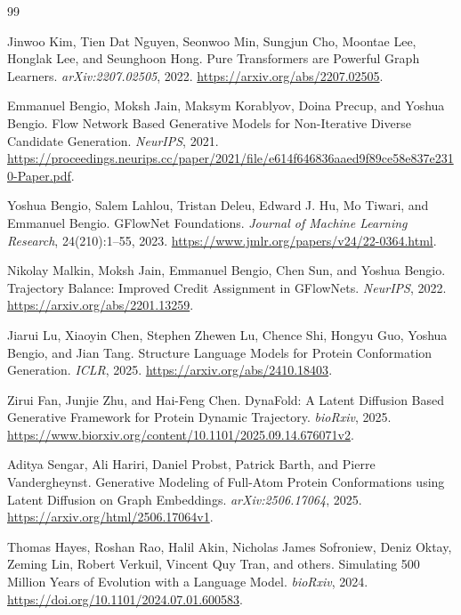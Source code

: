 \documentclass[11pt]{article}
\begin{document}
\newpage
\begin{thebibliography}{99}

Jinwoo Kim, Tien Dat Nguyen, Seonwoo Min, Sungjun Cho, Moontae Lee, Honglak Lee, and Seunghoon Hong.
\newblock Pure Transformers are Powerful Graph Learners.
\newblock \emph{arXiv:2207.02505}, 2022.
\newblock \url{https://arxiv.org/abs/2207.02505}.

Emmanuel Bengio, Moksh Jain, Maksym Korablyov, Doina Precup, and Yoshua Bengio.
\newblock Flow Network Based Generative Models for Non-Iterative Diverse Candidate Generation.
\newblock \emph{NeurIPS}, 2021.
\newblock \url{https://proceedings.neurips.cc/paper/2021/file/e614f646836aaed9f89ce58e837e2310-Paper.pdf}.

Yoshua Bengio, Salem Lahlou, Tristan Deleu, Edward J. Hu, Mo Tiwari, and Emmanuel Bengio.
\newblock GFlowNet Foundations.
\newblock \emph{Journal of Machine Learning Research}, 24(210):1--55, 2023.
\newblock \url{https://www.jmlr.org/papers/v24/22-0364.html}.

Nikolay Malkin, Moksh Jain, Emmanuel Bengio, Chen Sun, and Yoshua Bengio.
\newblock Trajectory Balance: Improved Credit Assignment in GFlowNets.
\newblock \emph{NeurIPS}, 2022.
\newblock \url{https://arxiv.org/abs/2201.13259}.

Jiarui Lu, Xiaoyin Chen, Stephen Zhewen Lu, Chence Shi, Hongyu Guo, Yoshua Bengio, and Jian Tang.
\newblock Structure Language Models for Protein Conformation Generation.
\newblock \emph{ICLR}, 2025.
\newblock \url{https://arxiv.org/abs/2410.18403}.

Zirui Fan, Junjie Zhu, and Hai-Feng Chen.
\newblock DynaFold: A Latent Diffusion Based Generative Framework for Protein Dynamic Trajectory.
\newblock \emph{bioRxiv}, 2025.
\newblock \url{https://www.biorxiv.org/content/10.1101/2025.09.14.676071v2}.

Aditya Sengar, Ali Hariri, Daniel Probst, Patrick Barth, and Pierre Vandergheynst.
\newblock Generative Modeling of Full-Atom Protein Conformations using Latent Diffusion on Graph Embeddings.
\newblock \emph{arXiv:2506.17064}, 2025.
\newblock \url{https://arxiv.org/html/2506.17064v1}.

Thomas Hayes, Roshan Rao, Halil Akin, Nicholas James Sofroniew, Deniz Oktay, Zeming Lin, Robert Verkuil, Vincent Quy Tran, and others.
\newblock Simulating 500 Million Years of Evolution with a Language Model.
\newblock \emph{bioRxiv}, 2024.
\newblock \url{https://doi.org/10.1101/2024.07.01.600583}.


\end{thebibliography}
\end{document}
